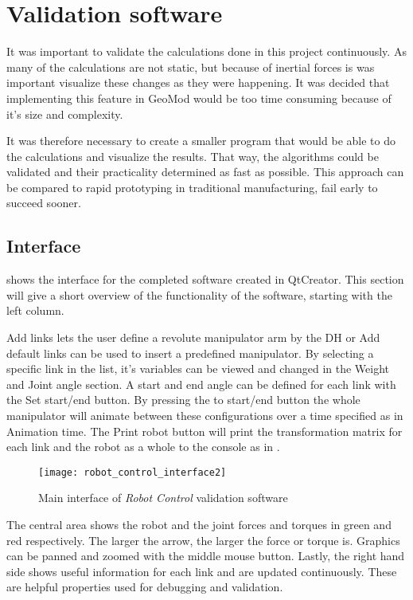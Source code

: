 \chapter{Validation software}

It was important to validate the calculations done in this project continuously. As many of the calculations are not static, but because of inertial forces is was important visualize these changes as they were happening. It was decided that implementing this feature in GeoMod would be too time consuming because of it's size and complexity. 

It was therefore necessary to create a smaller program that would be able to do the calculations and visualize the results. That way, the algorithms could be validated and their practicality determined as fast as possible. This approach can be compared to rapid prototyping in traditional manufacturing, fail early to succeed sooner.


\section{Interface}

 shows the interface for the completed software created in QtCreator. This section will give a short overview of the functionality of the software, starting with the left column.

\textsf{Add links} lets the user define a revolute manipulator arm by the \gls{DH} or \textsf{Add default links} can be used to insert a predefined manipulator. By selecting a specific link in the list, it's variables can be viewed and changed in the \textsf{Weight} and \textsf{Joint angle} section. A start and end angle can be defined for each link with the \textsf{Set start/end} button. By pressing the \textsf{to start/end} button the whole manipulator will animate between these configurations over a time specified as in \textsf{Animation time}. The \textsf{Print robot} button will print the transformation matrix for each link and the robot as a whole to the console as in .

\begin{figure}[h!]
    \centering
    \texttt{[image: robot\_control\_interface2]}
    \caption{Main interface of \textit{Robot Control} validation software}
    \label{interface}
\end{figure}

The central area shows the robot and the joint forces and torques in green and red respectively. The larger the arrow, the larger the force or torque is. Graphics can be panned and zoomed with the middle mouse button. Lastly, the right hand side shows useful information for each link and are updated continuously. These are helpful properties used for debugging and validation.

